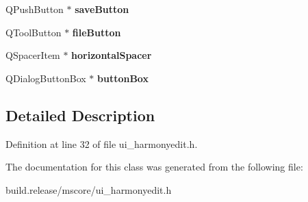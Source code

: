 \begin{DoxyCompactItemize}
Q\+Push\+Button $\ast$ {\bfseries save\+Button}
\item 
\mbox{\label{class_ui___chord_style_editor_a68f3faefa4333ed6397487bcfeb2e332}} 
Q\+Tool\+Button $\ast$ {\bfseries file\+Button}
\item 
\mbox{\label{class_ui___chord_style_editor_abcbf6bddf4bd831d3c6c1d765d78cf71}} 
Q\+Spacer\+Item $\ast$ {\bfseries horizontal\+Spacer}
\item 
\mbox{\label{class_ui___chord_style_editor_a99471a821957379e0274ced129e1fa29}} 
Q\+Dialog\+Button\+Box $\ast$ {\bfseries button\+Box}
\end{DoxyCompactItemize}


\subsection{Detailed Description}


Definition at line 32 of file ui\+\_\+harmonyedit.\+h.



The documentation for this class was generated from the following file\+:\begin{DoxyCompactItemize}
\item 
build.\+release/mscore/ui\+\_\+harmonyedit.\+h\end{DoxyCompactItemize}
